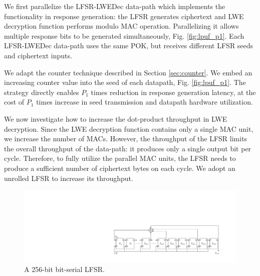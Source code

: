 We first parallelize the LFSR-LWEDec data-path which implements the functionality in response generation: the LFSR generates ciphertext and LWE decryption function performs modulo MAC operation. Parallelizing it allows multiple response bits to be generated simultaneously, Fig. \ref{fig:lpuf_p1}. Each LFSR-LWEDec data-path uses the same POK, but receives different LFSR seeds and ciphertext inputs. 

We adapt the counter technique described in Section \ref{sec:counter}. %
We embed an increasing counter value into the seed of each datapath, Fig. \ref{fig:lpuf_p1}. %
The strategy directly enables $P_1$ times reduction in response generation latency, at the cost of $P_1$ times increase in seed transmission and datapath hardware utilization.

We now investigate how to increase the dot-product throughput in LWE decryption. Since the LWE decryption function contains only a single MAC unit, we increase the number of MACs. However, the throughput of the LFSR limits the overall throughput of the data-path: it produces only a single output bit per cycle. %
Therefore, to fully utilize the parallel MAC units, the LFSR needs to produce a sufficient number of ciphertext bytes on each cycle. We adopt an unrolled LFSR to increase its throughput.

\begin{figure}[t!]
\centering
\includegraphics[width = 1.0\linewidth]{./figs/lfsr_baseline_compressed}
\caption{A 256-bit bit-serial LFSR.}
\label{fig:lfsr_baseline}
\end{figure}

